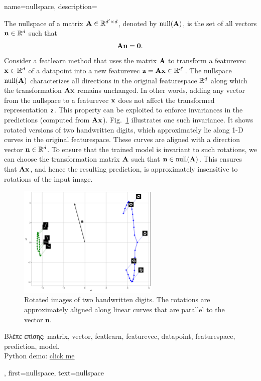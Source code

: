 {name={nullspace},
	description={The nullspace of a \gls{matrix} ${\bf A} \in \mathbb{R}^{d' \times d}$, 
		denoted by ${\rm null}({\bf A})$, is the set of all \gls{vector}s $\mathbf{n} \in \mathbb{R}^d$ 
    		such that $${\bf A} \mathbf{n} = \mathbf{0}.$$ 
		Consider a \gls{featlearn} method that uses the \gls{matrix} ${\bf A}$ to transform 
		a \gls{featurevec} $\mathbf{x} \in \mathbb{R}^{d}$ of a \gls{datapoint} 
		into a new \gls{featurevec} ${\bf z} = {\bf A} \mathbf{x} \in \mathbb{R}^{d'}$. 
		The nullspace ${\rm null}({\bf A})$ characterizes all directions in the original 
    		\gls{featurespace} $\mathbb{R}^{d}$ along which the transformation 
		${\bf A} \mathbf{x}$ remains unchanged. In other words, adding any \gls{vector} from 
		the nullspace to a \gls{featurevec} ${\bf x}$ does not affect the transformed 
		representation ${\bf z}$. This property can be exploited to enforce invariances in the 
		\gls{prediction}s (computed from ${\bf A} \mathbf{x}$). Fig.\ \ref{fig:nullspace-rotation-dict} 
		illustrates one such invariance. It shows rotated versions of two handwritten digits, 
		which approximately lie along 1-D curves in the original \gls{featurespace}. 
		These curves are aligned with a direction \gls{vector} $\mathbf{n} \in \mathbb{R}^{d}$. 
    		To ensure that the trained \gls{model} is invariant to such rotations, we can 
		choose the transformation \gls{matrix} ${\bf A}$ such that $\mathbf{n} \in {\rm null}({\bf A})$. 
		This ensures that ${\bf A} \mathbf{x}$, and hence the resulting \gls{prediction}, 
		is approximately insensitive to rotations of the input image.
		\begin{figure}[H]
      			\centering
      			\includegraphics[width=0.6\textwidth]{assets/pythonsnacks/nullspace_0_1.png}
	  		\caption{Rotated images of two handwritten digits. The rotations are approximately 
	  		aligned along linear curves that are parallel to the \gls{vector} $\mathbf{n}$.\label{fig:nullspace-rotation-dict}}	
	       	\end{figure}
		\foreignlanguage{greek}{Βλέπε επίσης:} \gls{matrix}, \gls{vector}, \gls{featlearn}, \gls{featurevec}, \gls{datapoint}, \gls{featurespace}, 
		\gls{prediction}, \gls{model}. \\ 
		Python demo: \href{https://github.com/AaltoDictionaryofML/AaltoDictionaryofML.github.io/blob/main/assets/pythonsnacks/nullspace.py}{click me}},
 	first={nullspace},
 	text={nullspace}
}


